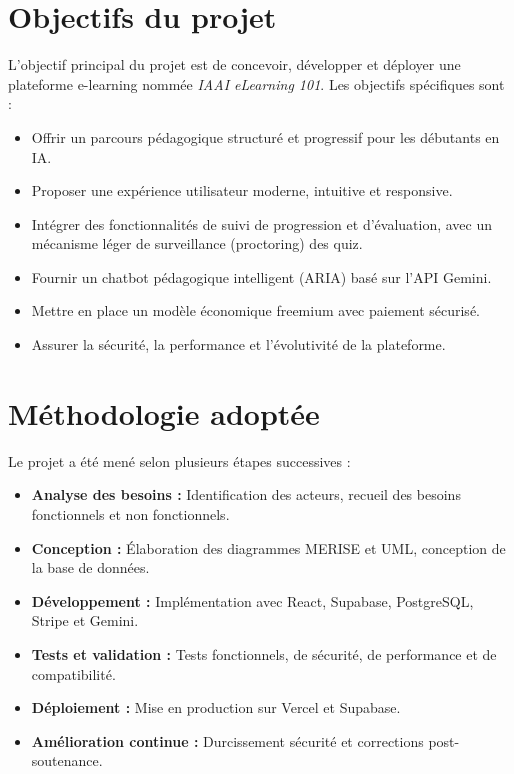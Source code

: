 \documentclass[12pt, a4paper]{report}
\begin{document}
\section{Objectifs du projet}
L'objectif principal du projet est de concevoir, développer et déployer une plateforme e-learning nommée \textit{IAAI eLearning 101}. Les objectifs spécifiques sont :
\begin{itemize}
    \item Offrir un parcours pédagogique structuré et progressif pour les débutants en IA.
    \item Proposer une expérience utilisateur moderne, intuitive et responsive.
    \item Intégrer des fonctionnalités de suivi de progression et d'évaluation, avec un mécanisme léger de surveillance (proctoring) des quiz.
    \item Fournir un chatbot pédagogique intelligent (ARIA) basé sur l'API Gemini.
    \item Mettre en place un modèle économique freemium avec paiement sécurisé.
    \item Assurer la sécurité, la performance et l'évolutivité de la plateforme.
\end{itemize}

\section{Méthodologie adoptée}
Le projet a été mené selon plusieurs étapes successives :
\begin{itemize}
    \item \textbf{Analyse des besoins :} Identification des acteurs, recueil des besoins fonctionnels et non fonctionnels.
    \item \textbf{Conception :} Élaboration des diagrammes MERISE et UML, conception de la base de données.
    \item \textbf{Développement :} Implémentation avec React, Supabase, PostgreSQL, Stripe et Gemini.
    \item \textbf{Tests et validation :} Tests fonctionnels, de sécurité, de performance et de compatibilité.
    \item \textbf{Déploiement :} Mise en production sur Vercel et Supabase.
    \item \textbf{Amélioration continue :} Durcissement sécurité et corrections post-soutenance.
\end{itemize}
\end{document}
